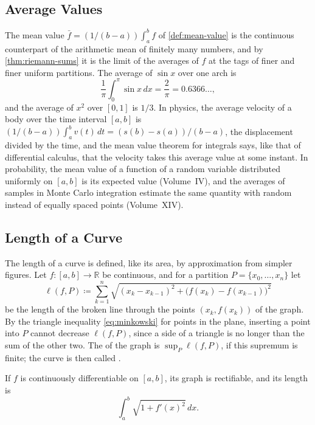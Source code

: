 \subsection{Average Values}

The mean value $\bar f=(1/(b-a))\int_a^bf$ of \cref{def:mean-value} is the continuous counterpart of the arithmetic mean of finitely many numbers, and by \cref{thm:riemann-sums} it is the limit of the averages of $f$ at the tags of finer and finer uniform partitions. The average of $\sin x$ over one arch is
\[
\frac1\pi\int_0^\pi\sin x\,dx=\frac2\pi=0.6366\ldots ,
\]
and the average of $x^2$ over $[0,1]$ is $1/3$. In physics, the average velocity of a body over the time interval $[a,b]$ is $(1/(b-a))\int_a^bv(t)\,dt=(s(b)-s(a))/(b-a)$, the displacement divided by the time, and the mean value theorem for integrals says, like that of differential calculus, that the velocity takes this average value at some instant. In probability, the mean value of a function of a random variable distributed uniformly on $[a,b]$ is its expected value (Volume~IV), and the averages of samples in Monte Carlo integration estimate the same quantity with random instead of equally spaced points (Volume~XIV).

\subsection{Length of a Curve}

The length of a curve is defined, like its area, by approximation from simpler figures. Let $f\colon[a,b]\to\mathbb R$ be continuous, and for a partition $P=\{x_0,\ldots,x_n\}$ let
\[
\ell(f,P)\coloneqq\sum_{k=1}^n\sqrt{(x_k-x_{k-1})^2+\bigl(f(x_k)-f(x_{k-1})\bigr)^2}
\]
be the length of the broken line through the points $(x_k,f(x_k))$ of the graph. By the triangle inequality \eqref{eq:minkowski} for points in the plane, inserting a point into $P$ cannot decrease $\ell(f,P)$, since a side of a triangle is no longer than the sum of the other two. The  of the graph is $\sup_P\ell(f,P)$, if this supremum is finite; the curve is then called .

\begin{theorem}
\label{thm:arc-length}
If $f$ is continuously differentiable on $[a,b]$, its graph is rectifiable, and its length is
\[
\int_a^b\sqrt{1+f'(x)^2}\,dx .
\]
\end{theorem}

